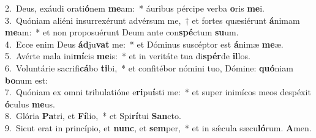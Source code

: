 {2.~}Deus, exáudi orati\textbf{ó}nem \textbf{me}am:~* áuribus pércipe verba \textbf{o}ris \textbf{me}i.\\
{3.~}Quóniam aliéni insurrexérunt advérsum me,~† et fortes quæsiérunt \textbf{á}nimam \textbf{me}am:~* et non proposuérunt Deum ante con\textbf{spé}ctum \textbf{su}um.\\
{4.~}Ecce enim Deus \textbf{ád}ju\textbf{vat} me:~* et Dóminus suscéptor est \textbf{á}nimæ \textbf{me}æ.\\
{5.~}Avérte mala ini\textbf{mí}cis \textbf{me}is:~* et in veritáte tua di\textbf{spér}de \textbf{il}los.\\
{6.~}Voluntárie sacrifi\textbf{cá}bo \textbf{ti}bi,~* et confitébor nómini tuo, Dómine: \textbf{quó}niam \textbf{bo}num est:\\
{7.~}Quóniam ex omni tribulatióne e\textbf{ri}pu\textbf{í}sti me:~* et super inimícos meos despéxit \textbf{ó}culus \textbf{me}us.\\
{8.~}Glória \textbf{Pa}tri, et \textbf{Fí}lio,~* et Spi\textbf{rí}tui \textbf{San}cto.\\
{9.~}Sicut erat in princípio, et \textbf{nunc}, et \textbf{sem}per,~* et in sǽcula sæcu\textbf{ló}rum. \textbf{A}men.\\
